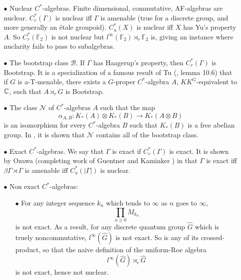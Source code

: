 \begin{itemize}

\item[$\bullet$] Nuclear $C^*$-algebras. Finite dimensional, commutative, AF-algebras are nuclear. $C_r^*(\Gamma)$ is nuclear iff $\Gamma$ is amenable (true for a discrete group, and more generally an \'etale groupoid). $C^*_u (X)$ is nuclear iff $X$ has Yu's property $A$. So $C_r^*(\mathbb F_2)$ is not nuclear but $l^\infty (\mathbb F_2) \rtimes_r \mathbb F_2$ is, giving an instance where nuclarity fails to pass to subalgebras.\\

\item[$\bullet$] The bootstrap class $\mathcal B$. If $\Gamma$ has Haagerup's property, then $C^*_r(\Gamma)$ is Bootstrap. It is a specialization of a famous result of Tu (\cite{TuThese}, lemma 10.6) that if $G$ is a-T-menable, there exists a $G$-proper $C^*$-algebra $A$, $KK^G$-equivalent to $\mathbb C$, such that $A\rtimes_r G$ is Bootstrap. \\

\item[$\bullet$] The class $\mathcal N$ of $C^*$-algebras $A$ such that the map 
\[\alpha_{A,B}: K_*(A)\otimes K_*(B) \rightarrow K_*(A \otimes B)\]
is an isomorphism for every $C^*$-algebra $B$ such that $K_*(B)$ is a free abelian group. In \cite{schochetRosenberg}, it is shown that $\mathcal N$ contains all of the bootstrap class.\\

\item[$\bullet$] Exact $C^*$-algebras. We say that $\Gamma$ is exact if $C_r^*(\Gamma)$ is exact. It is shown by Ozawa (completing work of Guentner and Kaminker \cite{GuentnerKaminkerExactness}) in \cite{OzawaExact} that $\Gamma$ is exact iff $\beta \Gamma \rtimes \Gamma$ is amenable iff $C^*_u(|\Gamma|)$ is nuclear.\\

\item[$\bullet$] Non exact $C^*$-algebras: \\

\begin{itemize}
\item[$\bullet$] For any integer sequence $k_n$ which tends to $\infty$ as $n$ goes to $\infty$, 
\[ \prod_{n\geq 0} M_{k_n} \]
is not exact. As a result, for any discrete quantum group $\hat G$ which is truely noncommutative, $l^\infty(\hat G)$ is not exact. So is any of its crossed-product, so that the naive definition of the uniform-Roe algebra 
\[l^\infty (\hat G) \rtimes_r \hat G\] 
is not exact, hence not nuclear.\\


\end{itemize}
\end{itemize}
